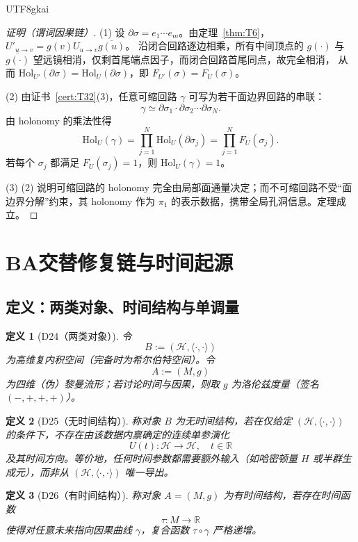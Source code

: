 \documentclass[12pt]{article}
\newtheorem{definition}{定义}[section]
\begin{document}
\begin{CJK*}{UTF8}{gkai}
\begin{proof}[证明（谓词因果链）]
(1) 设 $\partial\sigma=e_1\cdots e_m$。由定理~\ref{thm:T6}，$U'_{u\to v}=g(v)U_{u\to v}\overline{g(u)}$。
沿闭合回路逐边相乘，所有中间顶点的 $g(\cdot)$ 与 $\overline{g(\cdot)}$ 望远镜相消，仅剩首尾端点因子，而闭合回路首尾同点，故完全相消，
从而 $\mathrm{Hol}_{U'}(\partial\sigma)=\mathrm{Hol}_U(\partial\sigma)$，即 $F_{U'}(\sigma)=F_U(\sigma)$。

(2) 由证书~\ref{cert:T32}(3)，任意可缩回路 $\gamma$ 可写为若干面边界回路的串联：
\[
\gamma\simeq \partial\sigma_1\cdot\partial\sigma_2\cdots \partial\sigma_N.
\]
由 holonomy 的乘法性得
\[
\mathrm{Hol}_U(\gamma)=\prod_{j=1}^N \mathrm{Hol}_U(\partial\sigma_j)=\prod_{j=1}^N F_U(\sigma_j).
\]
若每个 $\sigma_j$ 都满足 $F_U(\sigma_j)=1$，则 $\mathrm{Hol}_U(\gamma)=1$。

(3) (2) 说明可缩回路的 holonomy 完全由局部面通量决定；而不可缩回路不受“面边界分解”约束，其 holonomy 作为 $\pi_1$ 的表示数据，携带全局孔洞信息。定理成立。
\end{proof}

\clearpage
\section{BA交替修复链与时间起源}
\label{sec:ba-time}

\subsection{定义：两类对象、时间结构与单调量}

\begin{definition}[D24（两类对象）]
\label{def:D24}
令
\[
B:= (\mathcal H,\langle\cdot,\cdot\rangle)
\]
为高维复内积空间（完备时为希尔伯特空间）。令
\[
A:= (M,g)
\]
为四维（伪）黎曼流形；若讨论时间与因果，则取 $g$ 为洛伦兹度量（签名 $(-,+,+,+)$）。
\end{definition}

\begin{definition}[D25（无时间结构）]
\label{def:D25}
称对象 $B$ 为\emph{无时间结构}，若在仅给定 $(\mathcal H,\langle\cdot,\cdot\rangle)$ 的条件下，不存在由该数据内禀确定的连续单参演化
\[
U(t):\mathcal H\to\mathcal H,\quad t\in\mathbb R
\]
及其时间方向。等价地，任何时间参数都需要额外输入（如哈密顿量 $H$ 或半群生成元），而非从 $(\mathcal H,\langle\cdot,\cdot\rangle)$ 唯一导出。
\end{definition}

\begin{definition}[D26（有时间结构）]
\label{def:D26}
称对象 $A=(M,g)$ 为\emph{有时间结构}，若存在时间函数
\[
\tau:M\to\mathbb R
\]
使得对任意未来指向因果曲线 $\gamma$，复合函数 $\tau\circ\gamma$ 严格递增。
\end{definition}


\end{CJK*}
\end{document}
